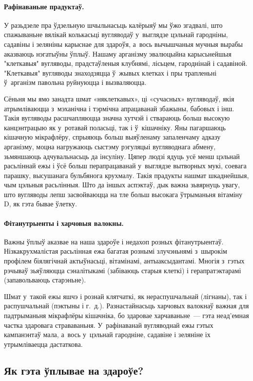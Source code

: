 \paragraph{Рафінаваньне прадуктаў.}
У разьдзеле пра ўдзельную шчыльнасьць калёрыяў мы ўжо згадвалі, што спажываньне вялікай колькасьці вугляводаў у~выглядзе цэльнай гародніны, садавіны і зеляніны карыснае для здароўя, а~вось вычышчаныя мучныя вырабы аказваюць нэгатыўны ўплыў. Нашаму арганізму эвалюцыйна карысьнейшыя "клеткавыя" вугляводы, прадстаўленыя клубнямі, лісьцем, гароднінай і садавіной. "Клеткавыя" вугляводы знаходзяцца ў~жывых клетках і пры трапленьні ў~арганізм павольна руйнуюцца і вызваляюцца.

Сёньня мы ямо занадта шмат «няклеткавых», ці «сучасных» вугляводаў, якія атрымліваюцца з~мэханічна і тэрмічна апрацаванай збажыны, бабовых і інш. Такія вугляводы расшчапляюцца значна хутчэй і ствараюць больш высокую канцэнтрацыю як у~ротавай поласьці, так і ў~кішачніку. Яны пагаршаюць кішачную мікрафлёру, спрыяюць больш выяўленаму запаленчаму адказу арганізму, моцна нагружаюць сыстэму рэгуляцыі вугляводнага абмену, зьмяншаюць адчувальнасьць да інсуліну. Цяпер людзі ядуць усё менш цэльнай расьліннай ежы і ўсё больш перапрацаванай у~выглядзе вытворных мукі, соевага парашку, высушанага бульбянога крухмалу. Такія прадукты нашмат шкаднейшыя, чым цэльныя расьлінныя. Што да іншых аспэктаў, дык важна зьвярнуць увагу, што вугляводы лепш засвойваюцца на тле больш высокага ўтрыманьня вітаміну D, як гэта бывае ўлетку.

\paragraph{Фітанутрыенты і харчовыя валокны.}
Важны ўплыў аказвае на наша здароўе і недахоп розных фітанутрыентаў. Нізкакрухмалістая расьлінная ежа багатая рознымі злучэньнямі з~шырокім профілем біялягічнай актыўнасьці, вітамінамі, антыаксыдантамі. Многія з~гэтых рэчываў зьяўляюцца сэналітыкамі (забіваюць старыя клеткі) і герапратэктарамі (запавольваюць старэньне).

Шмат у~такой ежы яшчэ і рознай клятчаткі, як нераспушчальнай (лігнаны), так і распушчальнай (пэктыны і г.~д.). Разнастайнасьць харчовых валокнаў важная для падтрыманьня мікрафлёры кішачніка, бо здаровае харчаваньне~--- гэта неад'емная частка здаровага страваваньня. У~рафінаванай вугляводнай ежы гэтых кампанэнтаў мала, а~вось у~цэльнай гародніне, садавіне і зеляніне іх утрымліваецца дастаткова.

\subsection{Як гэта ўплывае на здароўе?}

